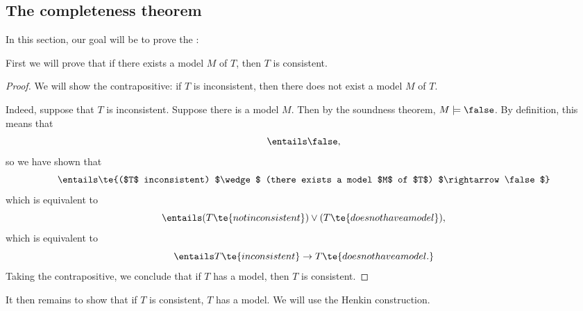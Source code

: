 \documentclass[11pt]{article}
\begin{document}
  \subsection{The completeness theorem}
In this section, our goal will be to prove the :

First we will prove that if there exists a model $M$ of $T$, then $T$ is consistent.

\begin{proof}
  We will show the contrapositive: if $T$ is inconsistent, then there does not exist a model $M$ of $T$.

  Indeed, suppose that $T$ is inconsistent. Suppose there is a model $M$. Then by the soundness theorem, $M \models \false$. By definition, this means that
  $$
\entails \false,
$$
so we have shown that
$$
\entails \te{($T$ inconsistent) $\wedge$ (there exists a model $M$ of $T$) $\rightarrow \false$}
$$
which is equivalent to
$$
\entails (T \te{ not inconsistent}) \lor (T \te{ does not have a model}),
$$
which is equivalent to
$$
\entails T \te{ inconsistent } \rightarrow T \te{ does not have a model.}
$$
Taking the contrapositive, we conclude that if $T$ has a model, then $T$ is consistent.
\end{proof}

It then remains to show that if $T$ is consistent, $T$ has a model. We will use the Henkin construction.



\end{document}
